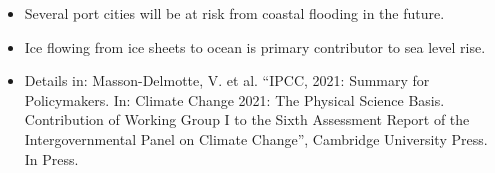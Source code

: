 \documentclass[10pt,final,xcolor=dvipsnames,aspect ratio=169]{beamer}
\begin{document}
\begin{frame}
	
	\vspace{0.1in}
	\begin{itemize}
		\item Several port cities will be at risk from coastal
		flooding in the future.
		\item Ice flowing from ice sheets to ocean is primary contributor
		to sea level rise.
	\end{itemize}
	
	\begin{itemize}
		\item [] \scriptsize{Details in: Masson-Delmotte, V. et al. ``IPCC,
			2021: Summary for Policymakers. In: Climate Change 2021: The
			Physical Science Basis. Contribution of Working Group I to the
			Sixth Assessment Report of the Intergovernmental Panel on Climate
			Change'', Cambridge University Press. In Press.}
	\end{itemize}
	
	
	
\end{frame}
\end{document}

